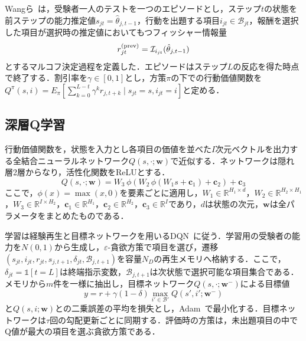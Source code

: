 \documentclass[paper]{ieicej}
\begin{document}
Wangら~\cite{WangLiuXu2024}は，受験者一人のテストを一つのエピソードとし，ステップ$t$の状態を前ステップの能力推定値$s_{jt}=\hat\theta_{j,t-1}$，行動を出題する項目$i_{jt}\in\mathcal{B}_{jt}$，報酬を選択した項目が選択時の推定値においてもつフィッシャー情報量
\begin{equation}
 r^{\rm (prev)}_{jt}=\mathcal{I}_{i_{jt}}(\hat\theta_{j,t-1})
 \label{eq:reward-prev}
\end{equation}
とするマルコフ決定過程を定義した．エピソードはステップ$L$の反応を得た時点で終了する．割引率を$\gamma\in[0,1]$とし，方策$\pi$の下での行動価値関数を$Q^\pi(s,i)=E_\pi[\sum_{k=0}^{L-t}\gamma^kr_{j,t+k}\mid s_{jt}=s,i_{jt}=i]$と定める．

\subsection{深層Q学習}\label{sec:dqn}

行動価値関数を，状態を入力とし各項目の価値を並べた$I$次元ベクトルを出力する全結合ニューラルネットワーク$Q(s,\cdot;\bm{w})$で近似する．ネットワークは隠れ層2層からなり，活性化関数をReLUとする．
\begin{equation}
 Q(s,\cdot;\bm{w})=W_3\,\phi\!\left(W_2\,\phi(W_1s+\bm{c}_1)+\bm{c}_2\right)+\bm{c}_3
 \label{eq:qnet}
\end{equation}
ここで，$\phi(x)=\max(x,0)$を要素ごとに適用し，$W_1\in\mathbb{R}^{H_1\times d}$，$W_2\in\mathbb{R}^{H_2\times H_1}$，$W_3\in\mathbb{R}^{I\times H_2}$，$\bm{c}_1\in\mathbb{R}^{H_1}$，$\bm{c}_2\in\mathbb{R}^{H_2}$，$\bm{c}_3\in\mathbb{R}^I$であり，$d$は状態の次元，$\bm{w}$は全パラメータをまとめたものである．

学習は経験再生と目標ネットワークを用いるDQN~\cite{Mnih2015}に従う．学習用の受験者の能力を$N(0,1)$から生成し，$\varepsilon$-貪欲方策で項目を選び，遷移$(s_{jt},i_{jt},r_{jt},s_{j,t+1},\delta_{jt},\mathcal{B}_{j,t+1})$を容量$N_D$の再生メモリへ格納する．ここで，$\delta_{jt}=\mathbb{1}[t=L]$は終端指示変数，$\mathcal{B}_{j,t+1}$は次状態で選択可能な項目集合である．メモリから$m$件を一様に抽出し，目標ネットワーク$Q(s,\cdot;\bm{w}^-)$による目標値
\begin{equation}
 y=r+\gamma(1-\delta)\max_{i'\in\mathcal{B}'}Q(s',i';\bm{w}^-)
 \label{eq:target}
\end{equation}
と$Q(s,i;\bm{w})$との二乗誤差の平均を損失とし，Adam~\cite{KingmaBa2015}で最小化する．目標ネットワークは$\tau$回の勾配更新ごとに同期する．評価時の方策は，未出題項目の中でQ値が最大の項目を選ぶ貪欲方策である．
\end{document}
